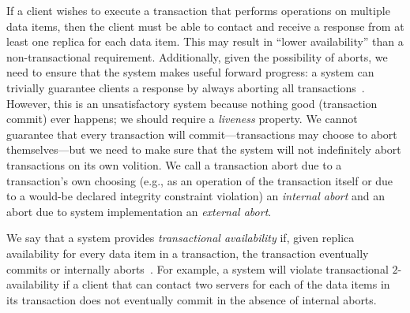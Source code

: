 If a client wishes to execute a transaction that performs operations
on multiple data items, then the client must be able to contact and
receive a response from at least one replica for each data item. This
may result in ``lower availability'' than a non-transactional
requirement. Additionally, given the possibility of aborts, we need to
ensure that the system makes useful forward progress: a system can
trivially guarantee clients a response by always aborting all
transactions~\cite{transaction-liveness}. However, this is an
unsatisfactory system because nothing good (transaction commit) ever
happens; we should require a \textit{liveness} property. We
cannot guarantee that every transaction will commit---transactions may
choose to abort themselves---but we need to make sure that the system
will not indefinitely abort transactions on its own volition. We call
a transaction abort due to a transaction's own choosing (e.g., as an
operation of the transaction itself or due to a would-be declared
integrity constraint violation) an \textit{internal abort} and an
abort due to system implementation an \textit{external abort}.

We say that a system provides \textit{transactional availability} if,
given replica availability for every data item in a transaction, the
transaction eventually commits or internally
aborts~\cite{hat-hotos}. For example, a system will violate
transactional $2$-availability if a client that can contact two
servers for each of the data items in its transaction does not
eventually commit in the absence of internal aborts.

